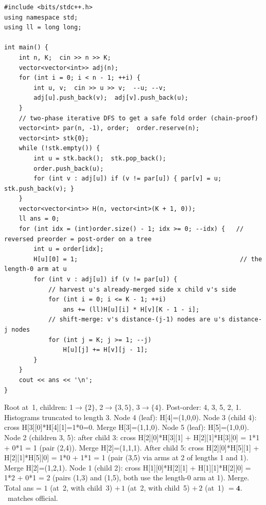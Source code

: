 \begin{lstlisting}[caption={CF 161D -- harvest-at-peak with per-node histogram, iterative to survive $n=5\cdot 10^{4}$ chains}, label={lst:c10-161d-soln}]
#include <bits/stdc++.h>
using namespace std;
using ll = long long;

int main() {
    int n, K;  cin >> n >> K;
    vector<vector<int>> adj(n);
    for (int i = 0; i < n - 1; ++i) {
        int u, v;  cin >> u >> v;  --u; --v;
        adj[u].push_back(v);  adj[v].push_back(u);
    }
    // two-phase iterative DFS to get a safe fold order (chain-proof)
    vector<int> par(n, -1), order;  order.reserve(n);
    vector<int> stk{0};
    while (!stk.empty()) {
        int u = stk.back();  stk.pop_back();
        order.push_back(u);
        for (int v : adj[u]) if (v != par[u]) { par[v] = u; stk.push_back(v); }
    }
    vector<vector<int>> H(n, vector<int>(K + 1, 0));
    ll ans = 0;
    for (int idx = (int)order.size() - 1; idx >= 0; --idx) {   // reversed preorder = post-order on a tree
        int u = order[idx];
        H[u][0] = 1;                                            // the length-0 arm at u
        for (int v : adj[u]) if (v != par[u]) {
            // harvest u's already-merged side x child v's side
            for (int i = 0; i <= K - 1; ++i)
                ans += (ll)H[u][i] * H[v][K - 1 - i];
            // shift-merge: v's distance-(j-1) nodes are u's distance-j nodes
            for (int j = K; j >= 1; --j)
                H[u][j] += H[v][j - 1];
        }
    }
    cout << ans << '\n';
}
\end{lstlisting}

\begin{tracebox}[Sample~1: $n=5$, $k=2$, edges $1\!-\!2,2\!-\!3,3\!-\!4,2\!-\!5$ $\Rightarrow$ 4]
Root at~1, children: 1$\to$$\{2\}$, 2$\to$$\{3,5\}$, 3$\to$$\{4\}$.
Post-order: 4, 3, 5, 2, 1. Histograms truncated to length 3.
Node 4 (leaf): H[4]=(1,0,0).
Node 3 (child 4): cross H[3][0]*H[4][1]=1*0=0. Merge H[3]=(1,1,0).
Node 5 (leaf): H[5]=(1,0,0).
Node 2 (children 3, 5): after child 3: cross H[2][0]*H[3][1] + H[2][1]*H[3][0]
  = 1*1 + 0*1 = 1 (pair (2,4)). Merge H[2]=(1,1,1). After child 5:
  cross H[2][0]*H[5][1] + H[2][1]*H[5][0] = 1*0 + 1*1 = 1 (pair (3,5)
  via arms at 2 of lengths 1 and 1). Merge H[2]=(1,2,1).
Node 1 (child 2): cross H[1][0]*H[2][1] + H[1][1]*H[2][0] = 1*2 + 0*1 = 2
  (pairs (1,3) and (1,5), both use the length-0 arm at 1). Merge.
Total ans = $1$ (at~2, with child~3) $+\,1$ (at~2, with child~5)
$+\,2$ (at~1) $= \mathbf{4}$. \checkmark\ matches official.
\end{tracebox}

